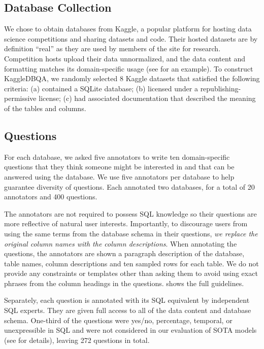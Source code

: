 \documentclass[11pt,a4paper]{article}
\newcommand{\systemname}{\mbox{KaggleDBQA}\xspace}
\begin{document}
\subsection{Database Collection}
\label{sec:dataset:kaggle}
We chose to obtain databases from Kaggle, a popular platform for hosting data
science competitions and sharing datasets and code.
Their hosted datasets are by definition ``real'' as they are used by members of the site for research.
Competition hosts upload their data unnormalized, and the data content and formatting matches its domain-specific usage
(see  for an example).
To construct \systemname, we randomly selected 8 Kaggle datasets that satisfied the following criteria:
(a) contained a SQLite database;
(b) licensed under a republishing-permissive license;
(c) had associated documentation that described the meaning of the tables and columns.



\subsection{Questions}
\label{sec:dataset:questions}
For each database, we asked five annotators to write ten domain-specific questions that they think someone might be
interested in and that can be answered using the database.
We use five annotators per database to help guarantee diversity of questions.
Each annotated two databases, for a total of 20 annotators and 400 questions.

The annotators are not required to possess SQL knowledge so their questions are more reflective of natural user
interests.
Importantly, to discourage users from using the same terms from the database schema in their questions, \emph{we replace
the original column names with the column descriptions}.
When annotating the questions, the annotators are shown a paragraph description of the database, table names, column
descriptions and ten sampled rows for each table.
We do not provide any constraints or templates other than asking them to avoid using exact phrases from the column
headings in the questions.
 shows the full guidelines.

Separately, each question is annotated with its SQL equivalent by independent SQL experts.
They are given full access to all of the data content and database schema.
One-third of the questions were yes/no, percentage, temporal, or unexpressible in SQL and were not considered in our
evaluation of SOTA models (see  for details), leaving 272 questions in total.
\end{document}
